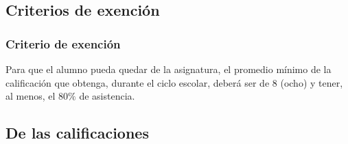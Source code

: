 \documentclass[14pt]{beamer}
\begin{document}
\subsection{Criterios de exención}

\begin{frame}
\frametitle{Criterio de exención}
Para que el alumno pueda quedar  de la asignatura, \pause el promedio mínimo de la calificación que obtenga, durante el ciclo escolar, deberá ser de 8 (ocho) y tener, al menos, el $80\%$ de asistencia.
\end{frame}

\subsection{De las calificaciones}
\end{document}

